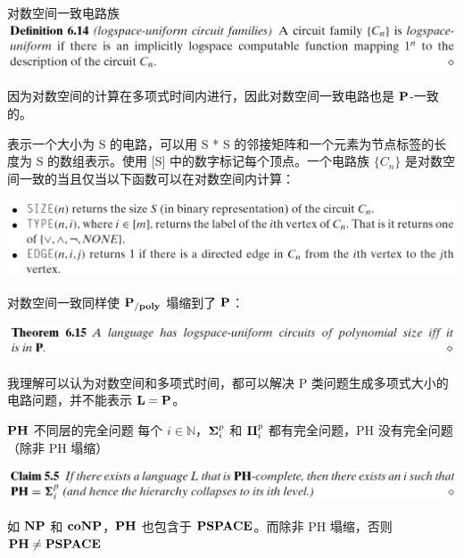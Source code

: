 \documentclass[UTF8,aspectratio=169,mathserif]{beamer}
\begin{document}
	\begin{frame}{对数空间一致电路族}
		\includegraphics[width=\linewidth]{../../5 & 6/note.assets/image-20210427151635788.png}\newline
		
		因为对数空间的计算在多项式时间内进行，因此对数空间一致电路也是 $\bf P$-一致的。
	\end{frame}
	\begin{frame}
		表示一个大小为 S 的电路，可以用 S * S 的邻接矩阵和一个元素为节点标签的长度为 S 的数组表示。使用 [S] 中的数字标记每个顶点。一个电路族 $\{C_n\}$ 是对数空间一致的当且仅当以下函数可以在对数空间内计算：\newline
		
		\includegraphics[width=\linewidth]{../../5 & 6/note.assets/image-20210427152140269.png}
	\end{frame}
	\begin{frame}
		对数空间一致同样使 $\bf P_{/poly}$ 塌缩到了 $\bf P$：\newline
		
		\includegraphics[width=\linewidth]{../../5 & 6/note.assets/image-20210427152252873.png}\newline
		
		我理解可以认为对数空间和多项式时间，都可以解决 P 类问题生成多项式大小的电路问题，并不能表示 $\bf L=P$。
	\end{frame}
	
	\begin{frame}{$\bf PH$ 不同层的完全问题}
		每个 $i\in\mathbb{N}$，${{\bf\Sigma}_i^p}$ 和 ${{\bf\Pi}_i^p}$ 都有完全问题，PH 没有完全问题（除非 PH 塌缩）\newline
		
		\includegraphics[width=\linewidth]{../../5 & 6/note.assets/image-20210427092442758.png}\newline
		
		如 $\bf NP$ 和 $\bf coNP$，$\bf PH$ 也包含于 $\bf PSPACE$。而除非 PH 塌缩，否则 $\bf PH\neq PSPACE$
	\end{frame}
	
\end{document}
